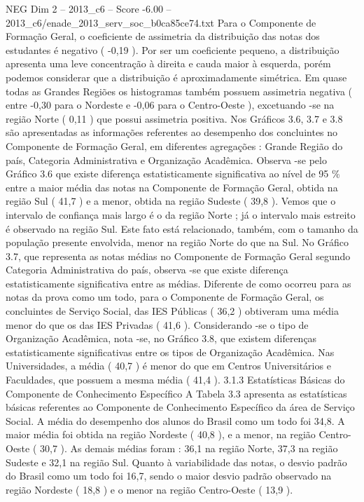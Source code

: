 \begin{textsample}{NEG Dim 2 – 2013\_c6 – Score -6.00 – 2013\_c6/enade\_2013\_serv\_soc\_b0ca85ce74.txt}
Para o Componente de Formação Geral, o coeficiente de assimetria da distribuição das notas dos estudantes é negativo ( -0,19 ).
Por ser um coeficiente pequeno, a distribuição apresenta uma leve concentração à direita e cauda maior à esquerda, porém podemos considerar que a distribuição é aproximadamente simétrica.
Em quase todas as Grandes Regiões os histogramas também possuem assimetria negativa ( entre -0,30 para o Nordeste e -0,06 para o Centro-Oeste ), excetuando -se na região Norte ( 0,11 ) que possui assimetria positiva.
Nos Gráficos 3.6, 3.7 e 3.8 são apresentadas as informações referentes ao desempenho dos concluintes no Componente de Formação Geral, em diferentes agregações : Grande Região do país, Categoria Administrativa e Organização Acadêmica.
Observa -se pelo Gráfico 3.6 que existe diferença estatisticamente significativa ao nível de 95 \% entre a maior média das notas na Componente de Formação Geral, obtida na região Sul ( 41,7 ) e a menor, obtida na região Sudeste ( 39,8 ).
Vemos que o intervalo de confiança mais largo é o da região Norte ; já o intervalo mais estreito é observado na região Sul.
Este fato está relacionado, também, com o tamanho da população presente envolvida, menor na região Norte do que na Sul.
No Gráfico 3.7, que representa as notas médias no Componente de Formação Geral segundo Categoria Administrativa do país, observa -se que existe diferença estatisticamente significativa entre as médias.
Diferente de como ocorreu para as notas da prova como um todo, para o Componente de Formação Geral, os concluintes de Serviço Social, das IES Públicas ( 36,2 ) obtiveram uma média menor do que os das IES Privadas ( 41,6 ).
Considerando -se o tipo de Organização Acadêmica, nota -se, no Gráfico 3.8, que existem diferenças estatisticamente significativas entre os tipos de Organização Acadêmica.
Nas Universidades, a média ( 40,7 ) é menor do que em Centros Universitários e Faculdades, que possuem a mesma média ( 41,4 ). 3.1.3 Estatísticas Básicas do Componente de Conhecimento Específico A Tabela 3.3 apresenta as estatísticas básicas referentes ao Componente de Conhecimento Específico da área de Serviço Social.
A média do desempenho dos alunos do Brasil como um todo foi 34,8.
A maior média foi obtida na região Nordeste ( 40,8 ), e a menor, na região Centro-Oeste ( 30,7 ).
As demais médias foram : 36,1 na região Norte, 37,3 na região Sudeste e 32,1 na região Sul.
Quanto à variabilidade das notas, o desvio padrão do Brasil como um todo foi 16,7, sendo o maior desvio padrão observado na região Nordeste ( 18,8 ) e o menor na região Centro-Oeste ( 13,9 ).

\end{textsample}
